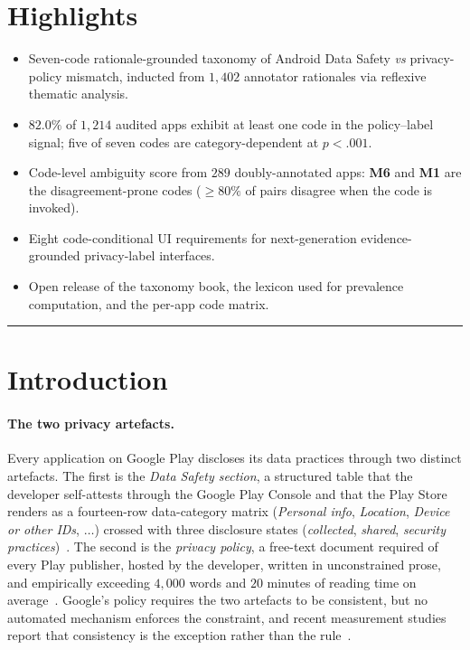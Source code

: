 \documentclass[11pt,a4paper]{article}
\newcommand{\code}[1]{\textsf{\textbf{#1}}}
\begin{document}
\section*{Highlights}
\begin{itemize}[leftmargin=1.4em,topsep=2pt,itemsep=0pt]
\item Seven-code rationale-grounded taxonomy of Android Data Safety
       \emph{vs} privacy-policy mismatch, inducted from $1{,}402$
       annotator rationales via reflexive thematic analysis.
\item $82.0\%$ of $1{,}214$ audited apps exhibit at least one code in
       the policy--label signal; five of seven codes are
       category-dependent at $p<.001$.
\item Code-level ambiguity score from $289$ doubly-annotated apps:
       \code{M6} and \code{M1} are the disagreement-prone
       codes ($\geq 80\%$ of pairs disagree when the code is invoked).
\item Eight code-conditional UI requirements for next-generation
       evidence-grounded privacy-label interfaces.
\item Open release of the taxonomy book, the lexicon used for prevalence
       computation, and the per-app code matrix.
\end{itemize}

\bigskip\hrule\bigskip

\section{Introduction}\label{sec:intro}

\paragraph{The two privacy artefacts.}
Every application on Google Play discloses its data practices through
two distinct artefacts. The first is the \emph{Data Safety section},
a structured table that the developer self-attests through the Google
Play Console and that the Play Store renders as a fourteen-row
data-category matrix (\textsl{Personal info}, \textsl{Location},
\textsl{Device or other IDs}, $\dots$) crossed with three disclosure
states (\textsl{collected}, \textsl{shared}, \textsl{security
practices})~\citep{googledatasafety2022}. The second is the
\emph{privacy policy}, a free-text document required of every Play
publisher, hosted by the developer, written in unconstrained prose, and
empirically exceeding $4{,}000$ words and $20$ minutes of reading time
on average~\citep{mcdonald2008cost,fabian2017large}. Google's policy
requires the two artefacts to be consistent, but no automated
mechanism enforces the constraint, and recent measurement studies
report that consistency is the exception rather than the
rule~\citep{xiao2023lalaine,khandelwal2024unpacking}.
\end{document}
